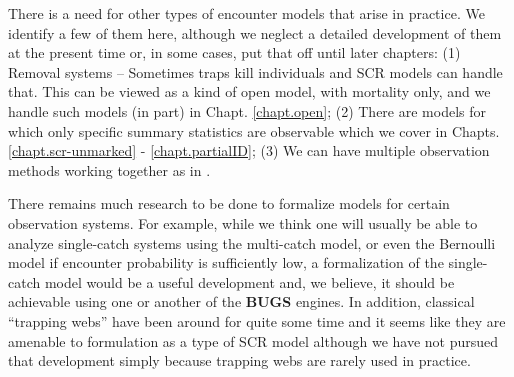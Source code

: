 There is a need for other types of encounter models that arise in practice. We
identify a few of them here, although we neglect a detailed
development of them at the present time or, in some cases, put that
off until later chapters: (1) Removal systems -- Sometimes traps kill
individuals and SCR models can handle that. This can be viewed as a
kind of open model, with mortality only, and we handle such models (in
part) in %
Chapt. \ref{chapt.open};  (2) There are models for which only specific
summary statistics are observable
\citep{chandler_royle:2012,sollmann_etal:2012ecol} which we cover in
Chapts. \ref{chapt.scr-unmarked} - \ref{chapt.partialID}; (3) We can
have multiple observation methods working together as in
\citet{gopalaswamy_etal:2012ecol}.

There remains much research to be done to formalize models for certain
observation systems. For example, while we think one will usually be
able to analyze single-catch systems using the multi-catch model, or
even the Bernoulli model if encounter probability is sufficiently low,
a formalization of the single-catch model would be a useful
development and, we believe, it should be achievable using one or
another of the {\bf BUGS} engines.  In addition, classical ``trapping
webs'' \citep{anderson_etal:1983, wilson_anderson:1985b,
  jett_nichols:1987, parmenter_etal:1989,link_barker:1994}
have been around for quite
some time and it seems like they are amenable to formulation as a type
of SCR model although we have not pursued that development simply
because trapping webs are rarely used in practice.

